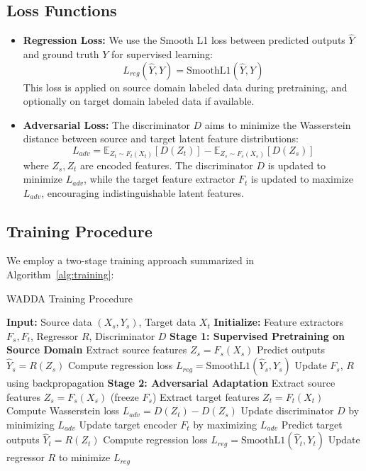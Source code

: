 \documentclass{article}
\begin{document}
\subsection{Loss Functions}
\begin{itemize}
  \item \textbf{Regression Loss:} We use the Smooth L1 loss between predicted outputs $\hat{Y}$ and ground truth $Y$ for supervised learning:
  \[
  L_{reg}(\hat{Y}, Y) = \text{SmoothL1}(\hat{Y}, Y)
  \]
  This loss is applied on source domain labeled data during pretraining, and optionally on target domain labeled data if available.
  
  \item \textbf{Adversarial Loss:} The discriminator $D$ aims to minimize the Wasserstein distance between source and target latent feature distributions:
  \[
  L_{adv} = \mathbb{E}_{Z_t \sim F_t(X_t)}[D(Z_t)] - \mathbb{E}_{Z_s \sim F_s(X_s)}[D(Z_s)]
  \]
  where $Z_s, Z_t$ are encoded features. The discriminator $D$ is updated to minimize $L_{adv}$, while the target feature extractor $F_t$ is updated to maximize $L_{adv}$, encouraging indistinguishable latent features.
\end{itemize}

\subsection{Training Procedure}
We employ a two-stage training approach summarized in Algorithm~\ref{alg:training}:

\begin{algorithm}
\caption{WADDA Training Procedure}
\label{alg:training}
\begin{algorithmic}[1]
\State \textbf{Input:} Source data $(X_s, Y_s)$, Target data $X_t$
\State \textbf{Initialize:} Feature extractors $F_s, F_t$, Regressor $R$, Discriminator $D$
\State \textbf{Stage 1: Supervised Pretraining on Source Domain}
    \State Extract source features $Z_s = F_s(X_s)$
    \State Predict outputs $\hat{Y}_s = R(Z_s)$
    \State Compute regression loss $L_{reg} = \text{SmoothL1}(\hat{Y}_s, Y_s)$
    \State Update $F_s$, $R$ using backpropagation
\EndFor
\State \textbf{Stage 2: Adversarial Adaptation}
        \State Extract source features $Z_s = F_s(X_s)$ (freeze $F_s$)
        \State Extract target features $Z_t = F_t(X_t)$
        \State Compute Wasserstein loss $L_{adv} = D(Z_t) - D(Z_s)$
        \State Update discriminator $D$ by minimizing $L_{adv}$
        \State Update target encoder $F_t$ by maximizing $L_{adv}$
        \State Predict target outputs $\hat{Y}_t = R(Z_t)$
            \State Compute regression loss $L_{reg} = \text{SmoothL1}(\hat{Y}_t, Y_t)$
            \State Update regressor $R$ to minimize $L_{reg}$
        \EndIf
    \EndFor
\EndFor
\end{algorithmic}
\end{algorithm}
\end{document}
